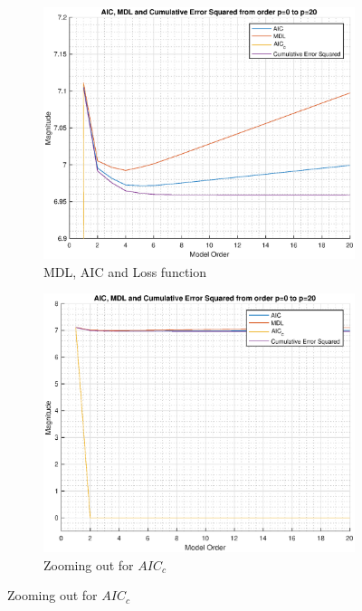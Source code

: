 \documentclass{article}
\begin{document}
\begin{figure}[h!]
\centering
\begin{subfigure}{0.32\textwidth}
\centering
\includegraphics[width = \textwidth]{heart_mdl_t3_zoom}
\caption{MDL, AIC and Loss function}
\label{fig:heart_mdl_t3_zoom}
\end{subfigure}
\begin{subfigure}{0.32\textwidth}
\centering
\includegraphics[width = \textwidth]{heart_mdl_t3}
\caption{Zooming out for $AIC_c$}
\label{fig:heart_mdl_t3}
\end{subfigure}

\end{figure}
\end{document}
